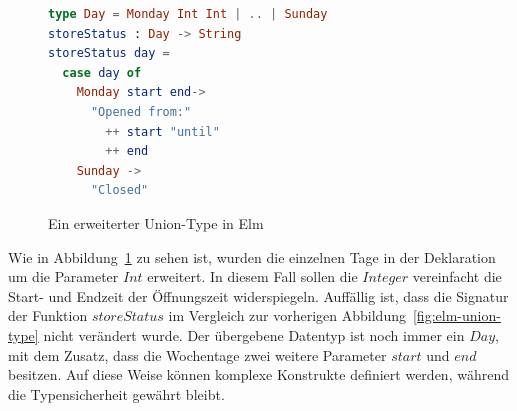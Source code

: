 \begin{figure}[h]
\begin{lstlisting}[language=Elm]
type Day = Monday Int Int | .. | Sunday
storeStatus : Day -> String
storeStatus day =
  case day of
    Monday start end->
      "Opened from:"
      	++ start "until"
      	++ end
    Sunday ->
      "Closed"
\end{lstlisting}
\caption{Ein erweiterter Union-Type in Elm}\label{fig:elm-union-type-advanced}
\end{figure}
Wie in Abbildung~\ref{fig:elm-union-type-advanced} zu sehen ist, wurden die einzelnen Tage in der Deklaration um die Parameter $Int$ erweitert. In diesem Fall sollen die $Integer$ vereinfacht die Start- und Endzeit der Öffnungszeit widerspiegeln. Auffällig ist, dass die Signatur der Funktion $storeStatus$ im Vergleich zur vorherigen Abbildung~\ref{fig:elm-union-type} nicht verändert wurde. Der übergebene Datentyp ist noch immer ein $Day$, mit dem Zusatz, dass die Wochentage zwei weitere Parameter $start$ und $end$ besitzen. Auf diese Weise können komplexe Konstrukte definiert werden, während die Typensicherheit gewährt bleibt.

